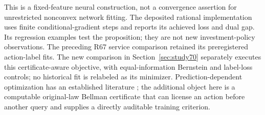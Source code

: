 This is a fixed-feature neural construction, not a convergence assertion for unrestricted nonconvex network fitting. The deposited rational implementation uses finite conditional-gradient steps and reports its achieved loss and dual gap. Its regression examples test the proposition; they are not new investment-policy observations. The preceding R67 service comparison retained its preregistered action-label fits. The new comparison in Section~\ref{sec:study70} separately executes this certificate-aware objective, with equal-information Bernstein and label-loss controls; no historical fit is relabeled as its minimizer. Prediction-dependent optimization has an established literature \citep{sakaue2023warm,sambharya2023}; the additional object here is a computable original-law Bellman certificate that can license an action before another query and supplies a directly auditable training criterion.
